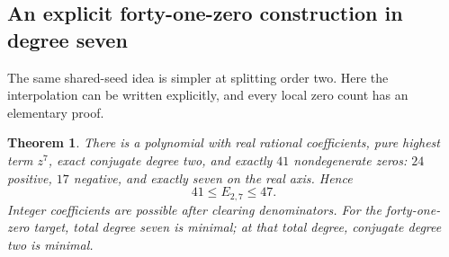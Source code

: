 \documentclass[UTF8,11pt]{ctexart}
\newtheorem{thm}{Theorem}[section]
\theoremstyle{definition}
\numberwithin{equation}{section}
\begin{document}
\subsection{An explicit forty-one-zero construction in degree seven}
\label{v37:sec:41}

The same shared-seed idea is simpler at splitting order two.
Here the interpolation can be written explicitly, and every
local zero count has an elementary proof.

\begin{thm}\label{v37:thm:41}
There is a polynomial with real rational coefficients, pure
highest term $z^7$, exact conjugate degree two, and exactly
$41$ nondegenerate zeros: $24$ positive, $17$ negative, and
exactly seven on the real axis. Hence
\begin{equation}\label{v37:eq:bound}
                         41\le E_{2,7}\le47.
\end{equation}
Integer coefficients are possible after clearing denominators.
For the forty-one-zero target, total degree seven is minimal;
at that total degree, conjugate degree two is minimal.
\end{thm}
\end{document}
